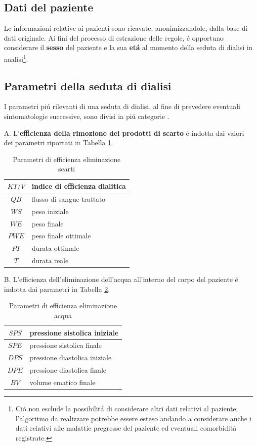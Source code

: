 \documentclass[preprint]{acm_proc_article-sp}
\begin{document}
\subsection{Dati del paziente}
Le informazioni relative ai pazienti sono ricavate, anonimizzandole, dalla base di dati originale. Ai fini del processo di estrazione delle regole, \'e opportuno considerare il \textbf{sesso} del paziente e la sua \textbf{et\'a} al momento della seduta di dialisi in analisi\footnote{Ci\'o non esclude la possibilit\'a di considerare altri dati relativi al paziente; l'algoritmo da realizzare potrebbe essere esteso andando a considerare anche i dati relativi alle malattie pregresse del paziente ed eventuali comorbidit\'a registrate.}.

\subsection{Parametri della seduta di dialisi}
I parametri pi\'u rilevanti di una seduta di dialisi, al fine di prevedere eventuali sintomatologie successive, sono divisi in pi\'u categorie \cite{bellazziintelligent}  \cite{pmid15749092}.

A. L'\textbf{efficienza della rimozione dei prodotti di scarto} \'e indotta dai valori dei parametri riportati in Tabella \ref{table:parametri-1}.

\begin{table}[h]
\centering
\begin{tabular}{|c|l|} \hline
$KT/V$ & indice di efficienza dialitica\\ \hline
$QB$ & flusso di sangue trattato\\ \hline
$WS$ & peso iniziale \\ \hline
$WE$ & peso finale \\ \hline
$PWE$ & peso finale ottimale \\ \hline
$PT$ & durata ottimale \\ \hline
$T$ & durata reale \\
\hline\end{tabular}
\caption{Parametri di efficienza eliminazione scarti}
\label{table:parametri-1}
\end{table}

B. L'efficienza dell'eliminazione dell'acqua all'interno del corpo del paziente \'e indotta dai parametri in Tabella \ref{table:parametri-2}.

\begin{table}[h]
\centering
\begin{tabular}{|c|l|} \hline
$SPS$ & pressione sistolica iniziale \\ \hline
$SPE$ & pressione sistolica finale \\ \hline
$DPS$ & pressione diastolica iniziale\\ \hline
$DPE$ & pressione diastolica finale\\ \hline
$BV$ & volume ematico finale\\
\hline\end{tabular}
\caption{Parametri di efficienza eliminazione acqua}
\label{table:parametri-2}
\end{table}
\end{document}

